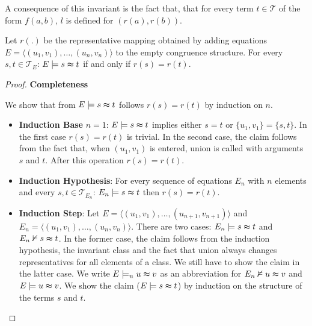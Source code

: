 A consequence of this invariant is the fact that, that for every term $t \in \mathcal{T}$ of the form $f(a,b)$, $l$ is defined for $(r(a),r(b))$.

\begin{proposition}

Let $r(.)$ be the representative mapping obtained by adding equations $E = \langle (u_1,v_1), \ldots, (u_n,v_n) \rangle $ to the empty congruence structure.
For every $s,t \in \mathcal{T}_E$: $E \models s \thickapprox t$ if and only if $r(s) = r(t)$.

\end{proposition}

\begin{proof}
\textbf{Completeness}

\noindent We show that from $E \models s \thickapprox t$ follows $r(s) = r(t)$ by induction on $n$.

\begin{itemize}
\item \textbf{Induction Base} $n=1$: $E \models s \thickapprox t$ implies either $s = t$ or $\{u_1,v_1\} = \{s,t\}$.
In the first case $r(s) = r(t)$ is trivial. 
In the second case, the claim follows from the fact that, when $(u_1,v_1)$ is entered, union is called with arguments $s$ and $t$.
After this operation $r(s) = r(t)$.

\item \textbf{Induction Hypothesis}: For every sequence of equations $E_n$ with $n$ elements and every $s,t \in \mathcal{T}_{E_n}$: $E_n \models s \thickapprox t$ then $r(s) = r(t)$.

\item \textbf{Induction Step}: Let $E = \langle (u_1,v_1), \ldots, (u_{n+1},v_{n+1}) \rangle$ and $E_n = \langle (u_1,v_1), \ldots, (u_n,v_n) \rangle$.
There are two cases: $E_n \models s\thickapprox t$ and $E_n \nvDash s\thickapprox t$.
In the former case, the claim follows from the induction hypothesis, the invariant class and the fact that union always changes representatives for all elements of a class.
We still have to show the claim in the latter case.
We write $E \models_n u \thickapprox v$ as an abbreviation for $E_n \nvDash u \thickapprox v$ and $E \models u \thickapprox v$.
We show the claim ($E \models s \thickapprox t$) by induction on the structure of the terms $s$ and $t$.


\end{itemize}
\end{proof}
